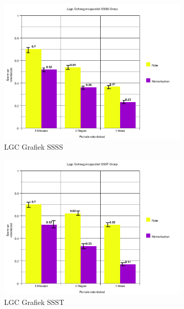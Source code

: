 \documentclass{hogent-article}
\begin{document}
\begin{figure}[H]
	\begin{subfigure}{0.45\textwidth}
		\includegraphics[width=\linewidth]{graph2}
		\caption{LGC Grafiek SSSS}
	\end{subfigure}
	\begin{subfigure}{0.45\textwidth}
		\includegraphics[width=\linewidth]{graph4}
		\caption{LGC Grafiek SSST}
	\end{subfigure}
	\begin{subfigure}{0.45\textwidth}

\end{subfigure}
\end{figure}
\end{document}
